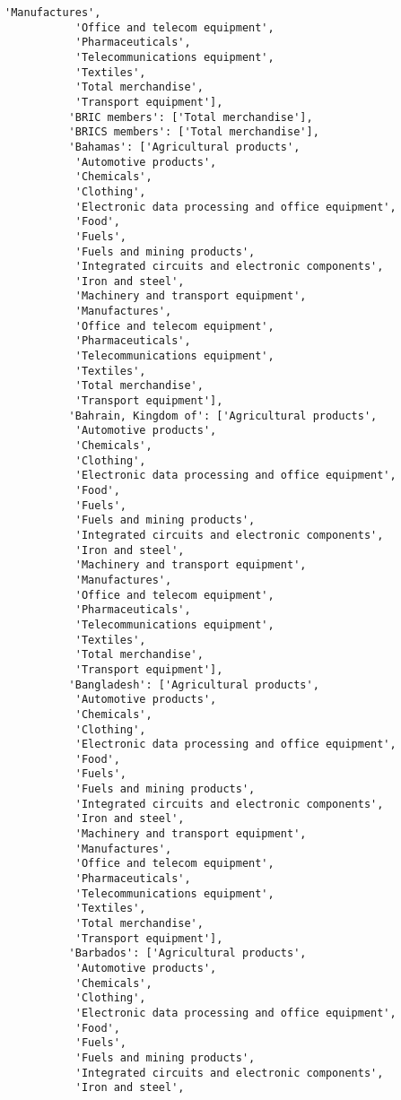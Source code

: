 \documentclass[11pt]{article}
\begin{document}
\begin{Verbatim}[commandchars=\\\{\}]
           'Manufactures',
           'Office and telecom equipment',
           'Pharmaceuticals',
           'Telecommunications equipment',
           'Textiles',
           'Total merchandise',
           'Transport equipment'],
          'BRIC members': ['Total merchandise'],
          'BRICS members': ['Total merchandise'],
          'Bahamas': ['Agricultural products',
           'Automotive products',
           'Chemicals',
           'Clothing',
           'Electronic data processing and office equipment',
           'Food',
           'Fuels',
           'Fuels and mining products',
           'Integrated circuits and electronic components',
           'Iron and steel',
           'Machinery and transport equipment',
           'Manufactures',
           'Office and telecom equipment',
           'Pharmaceuticals',
           'Telecommunications equipment',
           'Textiles',
           'Total merchandise',
           'Transport equipment'],
          'Bahrain, Kingdom of': ['Agricultural products',
           'Automotive products',
           'Chemicals',
           'Clothing',
           'Electronic data processing and office equipment',
           'Food',
           'Fuels',
           'Fuels and mining products',
           'Integrated circuits and electronic components',
           'Iron and steel',
           'Machinery and transport equipment',
           'Manufactures',
           'Office and telecom equipment',
           'Pharmaceuticals',
           'Telecommunications equipment',
           'Textiles',
           'Total merchandise',
           'Transport equipment'],
          'Bangladesh': ['Agricultural products',
           'Automotive products',
           'Chemicals',
           'Clothing',
           'Electronic data processing and office equipment',
           'Food',
           'Fuels',
           'Fuels and mining products',
           'Integrated circuits and electronic components',
           'Iron and steel',
           'Machinery and transport equipment',
           'Manufactures',
           'Office and telecom equipment',
           'Pharmaceuticals',
           'Telecommunications equipment',
           'Textiles',
           'Total merchandise',
           'Transport equipment'],
          'Barbados': ['Agricultural products',
           'Automotive products',
           'Chemicals',
           'Clothing',
           'Electronic data processing and office equipment',
           'Food',
           'Fuels',
           'Fuels and mining products',
           'Integrated circuits and electronic components',
           'Iron and steel',

\end{Verbatim}
\end{document}
